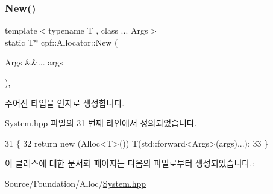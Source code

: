 \subsubsection{\texorpdfstring{New()}{New()}}
{\footnotesize\ttfamily template$<$typename T , class ... Args$>$ \\
static T$\ast$ cpf\+::\+Allocator\+::\+New (\begin{DoxyParamCaption}\item[{Args \&\&...}]{args }\end{DoxyParamCaption})\hspace{0.3cm}{\ttfamily [inline]}, {\ttfamily [static]}}

주어진 타입을 인자로 생성합니다. 

System.\+hpp 파일의 31 번째 라인에서 정의되었습니다.


\begin{DoxyCode}
31                                        \{
32             \textcolor{keywordflow}{return} \textcolor{keyword}{new} (Alloc<T>()) T(std::forward<Args>(args)...);
33         \}
\end{DoxyCode}


이 클래스에 대한 문서화 페이지는 다음의 파일로부터 생성되었습니다.\+:\begin{DoxyCompactItemize}
\item 
Source/\+Foundation/\+Alloc/\hyperlink{_system_8hpp}{System.\+hpp}\end{DoxyCompactItemize}

